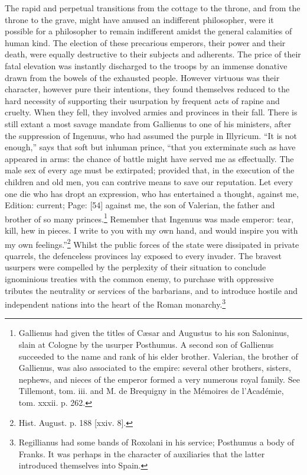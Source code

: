 The rapid and perpetual transitions from the cottage to the throne, and from the throne to the grave, might have amused an indifferent philosopher, were it possible for a philosopher to remain indifferent amidst the general calamities of human kind. The election of these precarious emperors, their power and their death, were equally destructive to their subjects and adherents. The price of their fatal elevation was instantly discharged to the troops by an immense donative drawn from the bowels of the exhausted people. However virtuous was their character, however pure their intentions, they found themselves reduced to the hard necessity of supporting their usurpation by frequent acts of rapine and cruelty. When they fell, they involved armies and provinces in their fall. There is still extant a most savage mandate from Gallienus to one of his ministers, after the suppression of Ingenuus, who had assumed the purple in Illyricum. \texthebrew{“}It is not enough,\texthebrew{}” says that soft but inhuman prince, \texthebrew{“}that you exterminate such as have appeared in arms: the chance of battle might have served me as effectually. The male sex of every age must be extirpated; provided that, in the execution of the children and old men, you can contrive means to save our reputation. Let every one die who has dropt an expression, who has entertained a thought, against me, Edition: current; Page: [54] against me, the son of Valerian, the father and brother of so many princes.\footnote{Gallienus had given the titles of Cæsar and Augustus to his son Saloninus, slain at Cologne by the usurper Posthumus. A second son of Gallienus succeeded to the name and rank of his elder brother. Valerian, the brother of Gallienus, was also associated to the empire: several other brothers, sisters, nephews, and nieces of the emperor formed a very numerous royal family. See Tillemont, tom. iii. and M. de Brequigny in the Mémoires de l\texthebrew{}’Académie, tom. xxxii. p. 262.} Remember that Ingenuus was made emperor: tear, kill, hew in pieces. I write to you with my own hand, and would inspire you with my own feelings.\texthebrew{}”\footnote{Hist. August. p. 188 [xxiv. 8].} Whilst the public forces of the state were dissipated in private quarrels, the defenceless provinces lay exposed to every invader. The bravest usurpers were compelled by the perplexity of their situation to conclude ignominious treaties with the common enemy, to purchase with oppressive tributes the neutrality or services of the barbarians, and to introduce hostile and independent nations into the heart of the Roman monarchy.\footnote{Regillianus had some bands of Roxolani in his service; Posthumus a body of Franks. It was perhaps in the character of auxiliaries that the latter introduced themselves into Spain.}

